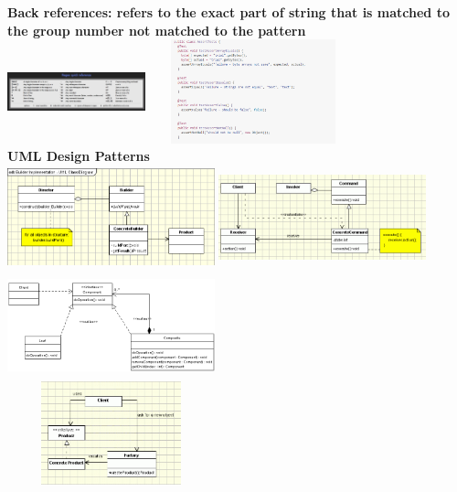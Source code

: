 \documentclass{article}
\begin{document}
\textbf{Back references: refers to the exact part of string that is matched to the group number not matched to the pattern \\}
\includegraphics[width=4cm,height =3cm]{regexTable.jpg}
\includegraphics[width=6cm,height =3cm]{testCases.png}\\
\textbf{UML Design Patterns}\\
\includegraphics[width=6cm,height =3cm]{builder.png}
\includegraphics[width=6cm,height =3cm]{command.png}
\includegraphics[width=6cm,height =3cm]{composite.png}\\
\includegraphics[width=6cm,height =3cm]{factory.png}
\end{document}
